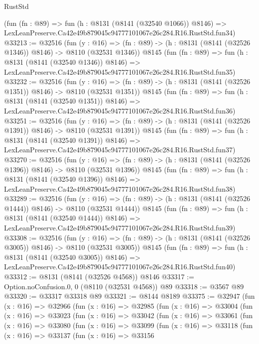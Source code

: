 \begin{lexlean}{RustStd}
\begin{coremodule}
    (fun (fn : @89) =>
    fun (h : @8131 (@8141 (@32540 @1066)) @8146) =>
    LexLeanPreserve.Ca42e49b879045c94777101067e26c284.R16.RustStd.fun34)
@33213 := @32516
    (fun (y : @16) =>
    (fn : @89) -> (h : @8131 (@8141 (@32526 @1346)) @8146) -> @8110 (@32531 @1346))
    @8145
    (fun (fn : @89) =>
    fun (h : @8131 (@8141 (@32540 @1346)) @8146) =>
    LexLeanPreserve.Ca42e49b879045c94777101067e26c284.R16.RustStd.fun35)
@33232 := @32516
    (fun (y : @16) =>
    (fn : @89) -> (h : @8131 (@8141 (@32526 @1351)) @8146) -> @8110 (@32531 @1351))
    @8145
    (fun (fn : @89) =>
    fun (h : @8131 (@8141 (@32540 @1351)) @8146) =>
    LexLeanPreserve.Ca42e49b879045c94777101067e26c284.R16.RustStd.fun36)
@33251 := @32516
    (fun (y : @16) =>
    (fn : @89) -> (h : @8131 (@8141 (@32526 @1391)) @8146) -> @8110 (@32531 @1391))
    @8145
    (fun (fn : @89) =>
    fun (h : @8131 (@8141 (@32540 @1391)) @8146) =>
    LexLeanPreserve.Ca42e49b879045c94777101067e26c284.R16.RustStd.fun37)
@33270 := @32516
    (fun (y : @16) =>
    (fn : @89) -> (h : @8131 (@8141 (@32526 @1396)) @8146) -> @8110 (@32531 @1396))
    @8145
    (fun (fn : @89) =>
    fun (h : @8131 (@8141 (@32540 @1396)) @8146) =>
    LexLeanPreserve.Ca42e49b879045c94777101067e26c284.R16.RustStd.fun38)
@33289 := @32516
    (fun (y : @16) =>
    (fn : @89) -> (h : @8131 (@8141 (@32526 @1444)) @8146) -> @8110 (@32531 @1444))
    @8145
    (fun (fn : @89) =>
    fun (h : @8131 (@8141 (@32540 @1444)) @8146) =>
    LexLeanPreserve.Ca42e49b879045c94777101067e26c284.R16.RustStd.fun39)
@33308 := @32516
    (fun (y : @16) =>
    (fn : @89) -> (h : @8131 (@8141 (@32526 @3005)) @8146) -> @8110 (@32531 @3005))
    @8145
    (fun (fn : @89) =>
    fun (h : @8131 (@8141 (@32540 @3005)) @8146) =>
    LexLeanPreserve.Ca42e49b879045c94777101067e26c284.R16.RustStd.fun40)
@33312 := @8131 (@8141 (@32526 @4568)) @8146
@33317 := Option.noConfusion.{0, 0} (@8110 (@32531 @4568)) @89
@33318 := @3567 @89
@33320 := @33317 @33318 @89
@33321 := @8144 @8189
@33375 := @32947
    (fun (x : @16) =>
    @32966
      (fun (x : @16) =>
      @32985
        (fun (x : @16) =>
        @33004
          (fun (x : @16) =>
          @33023
            (fun (x : @16) =>
            @33042
              (fun (x : @16) =>
              @33061
                (fun (x : @16) =>
                @33080
                  (fun (x : @16) =>
                  @33099
                    (fun (x : @16) =>
                    @33118
                      (fun (x : @16) =>
                      @33137
                        (fun (x : @16) =>
                        @33156

\end{coremodule}
\end{lexlean}
